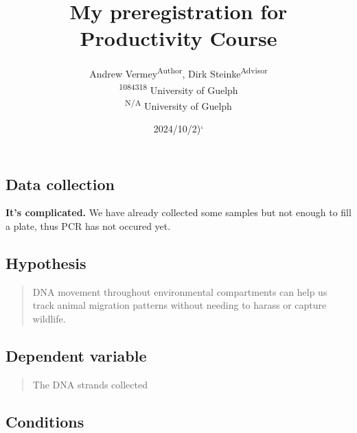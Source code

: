 \documentclass[]{article}
\title{My preregistration for Productivity Course}
\author{
          Andrew Vermey\textsuperscript{Author},
          Dirk
Steinke\textsuperscript{Advisor}          \\ \vspace{0.5cm}
              \textsuperscript{1084318} University of Guelph\\
              \textsuperscript{N/A} University of Guelph      }
\date{2024/10/2)`}
\newcounter{question}
\begin{document}
\maketitle
\vspace{2pc}


\ifPDFTeX
  \newcommand\Question[2]{%
   \leavevmode\par
   \stepcounter{question}
   \noindent
   \textbf{\thequestion. #1}. #2\par}
\else %
  \NewCommandCopy{\oldQuestion}{\Question}
  \renewcommand\Question[2]{%
   \leavevmode\par
   \stepcounter{question}
   \noindent
   \textbf{\thequestion. #1}. #2\par}
\fi



\newcommand\Answer[1]{%
    \noindent
    \textit{Registered response}: #1\par}

\hypertarget{data-collection}{%
\subsection{Data collection}\label{data-collection}}

\textbf{It's complicated.} We have already collected some samples but
not enough to fill a plate, thus PCR has not occured yet.

\hypertarget{hypothesis}{%
\subsection{Hypothesis}\label{hypothesis}}

\begin{quote}
DNA movement throughout environmental compartments can help us track
animal migration patterns without needing to harass or capture wildlife.
\end{quote}

\hypertarget{dependent-variable}{%
\subsection{Dependent variable}\label{dependent-variable}}

\begin{quote}
The DNA strands collected
\end{quote}

\hypertarget{conditions}{%
\subsection{Conditions}\label{conditions}}
\end{document}
